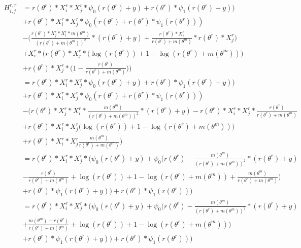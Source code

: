 \documentclass[bibliography=totoc,10pt]{scrartcl}
\begin{document}
\begin{equation}
\begin{split}
H^{r,r}_{i,j} &= r(\theta^r) * X^r_{i} * X^r_{j} * \psi_0(r(\theta^r)+y) +  r(\theta^r) *  \psi_1(r(\theta^r)+y) ) \\
&+ r(\theta^r) * X^r_{i} * X^r_{j} * \psi_0(r(\theta^r) +  r(\theta^r) *  \psi_1(r(\theta^r)) ) \\
&- \bigg( \frac{r(\theta^r) * X^r_{j} * X^r_{i}* m(\theta^m) }{(r(\theta^r)+m(\theta^m))^2} *(r(\theta^r) + y) + \frac{r(\theta^r) * X^r_{i} }{r(\theta^r)+m(\theta^m)} *r(\theta^r) * X^r_{j} \bigg) \\
&+ X^r_{i} * \bigg(  r(\theta^r) * X^r_{j} * \bigg( \log(r(\theta^r)) + 1 - \log(r(\theta^r)+m(\theta^m)) \bigg) \\
&+ r(\theta^r) *X^r_{j} * \bigg( 1 - \frac{r(\theta^r)}{r(\theta^r)+m(\theta^m)} \bigg)  \bigg) \\
&= r(\theta^r) * X^r_{i} * X^r_{j} * \psi_0(r(\theta^r)+y) +  r(\theta^r) *  \psi_1(r(\theta^r)+y) ) \\
&+ r(\theta^r) * X^r_{i} * X^r_{j} * \psi_0(r(\theta^r) +  r(\theta^r) *  \psi_1(r(\theta^r)) ) \\
&- \bigg( r(\theta^r) * X^r_{j} * X^r_{i} * \frac{m(\theta^m) }{(r(\theta^r)+m(\theta^m))^2} *(r(\theta^r) + y) - r(\theta^r) * X^r_{i} * X^r_{j} *  \frac{r(\theta^r)}{r(\theta^r)+m(\theta^m)}  \\
&+ r(\theta^r) * X^r_{i} * X^r_{j} \bigg( \log(r(\theta^r)) + 1 - \log(r(\theta^r)+m(\theta^m)) \bigg) \\
&+ r(\theta^r) * X^r_{i} * X^r_{j} \frac{m(\theta^m)}{r(\theta^r)+m(\theta^m)} \bigg) \\
&= r(\theta^r) * X^r_{i} * X^r_{j} * \bigg(  \psi_0(r(\theta^r)+y) + \psi_0(r(\theta^r) - \frac{m(\theta^m) }{(r(\theta^r)+m(\theta^m))^2} *(r(\theta^r) + y) \\
&-  \frac{r(\theta^r)}{r(\theta^r)+m(\theta^m)} + \log(r(\theta^r)) + 1 - \log(r(\theta^r)+m(\theta^m)) + \frac{m(\theta^m)}{r(\theta^r)+m(\theta^m)}\bigg) \\
&+  r(\theta^r) *  \psi_1(r(\theta^r)+y) ) +  r(\theta^r) *  \psi_1(r(\theta^r)) ) \\
&= r(\theta^r) * X^r_{i} * X^r_{j} * \bigg(  \psi_0(r(\theta^r)+y) + \psi_0(r(\theta^r) - \frac{m(\theta^m) }{(r(\theta^r)+m(\theta^m))^2} *(r(\theta^r) + y) \\
&+  \frac{m(\theta^m) - r(\theta^r)}{r(\theta^r)+m(\theta^m)} + \log(r(\theta^r)) + 1 - \log(r(\theta^r)+m(\theta^m)) \bigg) \\
&+  r(\theta^r) *  \psi_1(r(\theta^r)+y) ) +  r(\theta^r) *  \psi_1(r(\theta^r)) ) \\
\end{split}
\end{equation}
\end{document}
